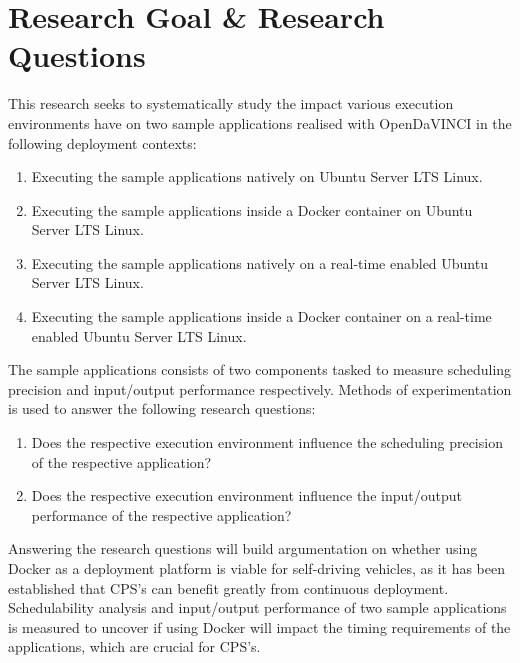 \section{Research Goal \& Research Questions}

This research seeks to systematically study the impact various execution environments have on two sample applications realised with OpenDaVINCI in the following deployment contexts:\\ 

\begin{enumerate}
\item Executing the sample applications natively on Ubuntu Server LTS Linux.
\item Executing the sample applications inside a Docker container on Ubuntu Server LTS Linux.
\item Executing the sample applications natively on a real-time enabled Ubuntu Server LTS Linux.
\item Executing the sample applications inside a Docker container on a real-time enabled Ubuntu Server LTS Linux.\\
\end{enumerate}

The sample applications consists of two components tasked to measure scheduling precision and input/output performance respectively. 
Methods of experimentation is used to answer the following research questions:\\
\begin{enumerate}[label=\textbf{RQ\arabic*}]
\label{section:rqs}
	\item Does the respective execution environment influence the scheduling precision of the respective application?
	\item Does the respective execution environment influence the input/output performance of the respective application?\\
\end{enumerate}

Answering the research questions will build argumentation on whether using Docker as a deployment platform is viable for self-driving vehicles, as it has been established that CPS's can benefit greatly from continuous deployment. Schedulability analysis and input/output performance of two sample applications is measured to uncover if using Docker will impact the timing requirements of the applications, which are crucial for CPS's.



